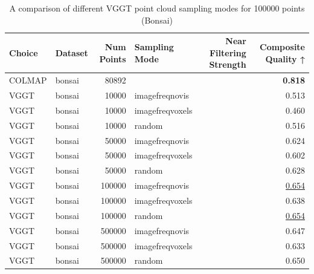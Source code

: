 \begin{table}[H]
\caption{\ifdefined\customcaption \customcaption \else A comparison of different VGGT point cloud sampling modes for 100000 points (Bonsai) \fi}
\label{tab:03_sampling_mode_single_bonsai}
\centering
\scriptsize
\begin{tabular}{llrlrr}
\toprule
Choice & Dataset & Num Points & Sampling Mode & Near Filtering Strength & Composite Quality ↑ \\
\midrule
COLMAP & bonsai & 80892 &  &  & \textbf{0.818} \\
VGGT & bonsai & 10000 & imagefreqnovis &  & 0.513 \\
VGGT & bonsai & 10000 & imagefreqvoxels &  & 0.460 \\
VGGT & bonsai & 10000 & random &  & 0.516 \\
VGGT & bonsai & 50000 & imagefreqnovis &  & 0.624 \\
VGGT & bonsai & 50000 & imagefreqvoxels &  & 0.602 \\
VGGT & bonsai & 50000 & random &  & 0.628 \\
VGGT & bonsai & 100000 & imagefreqnovis &  & \underline{0.654} \\
VGGT & bonsai & 100000 & imagefreqvoxels &  & 0.638 \\
VGGT & bonsai & 100000 & random &  & \underline{0.654} \\
VGGT & bonsai & 500000 & imagefreqnovis &  & 0.647 \\
VGGT & bonsai & 500000 & imagefreqvoxels &  & 0.633 \\
VGGT & bonsai & 500000 & random &  & 0.650 \\
\bottomrule
\end{tabular}
\end{table}